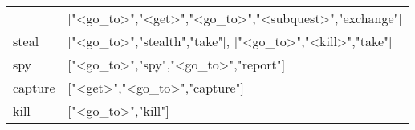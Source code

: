 \begin{table}[]
{\begin{tabular}{ll}
 &
  {[}"\textless{}go\_to\textgreater{}","\textless{}get\textgreater{}","\textless{}go\_to\textgreater{}","\textless{}subquest\textgreater{}","exchange"{]} \\
steal &
  {[}"\textless{}go\_to\textgreater{}","stealth","take"{]},   {[}"\textless{}go\_to\textgreater{}","\textless{}kill\textgreater{}","take"{]} \\
spy &
  {[}"\textless{}go\_to\textgreater{}","spy","\textless{}go\_to\textgreater{}","report"{]} \\
capture &
  {[}"\textless{}get\textgreater{}","\textless{}go\_to\textgreater{}","capture"{]} \\
kill &
  {[}"\textless{}go\_to\textgreater{}","kill"{]} \\ \hline
\end{tabular}
}
\end{table}